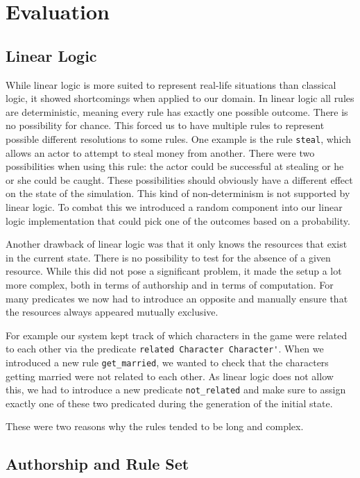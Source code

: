 \section{Evaluation} \label{evaulation}

\subsection{Linear Logic}
While linear logic is more suited to represent real-life situations than classical logic, it showed shortcomings when applied to our domain.
In linear logic all rules are deterministic, meaning every rule has exactly one possible outcome.
There is no possibility for chance.
This forced us to have multiple rules to represent possible different resolutions to some rules.
One example is the rule \lstinline{steal}, which allows an actor to attempt to steal money from another.
There were two possibilities when using this rule: the actor could be successful at stealing or he or she could be caught.
These possibilities should obviously have a different effect on the state of the simulation.
This kind of non-determinism is not supported by linear logic.
To combat this we introduced a random component into our linear logic implementation that could pick one of the outcomes based on a probability.


Another drawback of linear logic was that it only knows the resources that exist in the current state.
There is no possibility to test for the absence of a given resource.
While this did not pose a significant problem, it made the setup a lot more complex, both in terms of authorship and in terms of computation.
For many predicates we now had to introduce an opposite and manually ensure that the resources always appeared mutually exclusive.

For example our system kept track of which characters in the game were related to each other via the predicate \lstinline{related Character Character'}.
When we introduced a new rule \lstinline{get_married}, we wanted to check that the characters getting married were not related to each other.
As linear logic does not allow this, we had to introduce a new predicate \lstinline{not_related} and make sure to assign exactly one of these two predicated during the generation of the initial state.

These were two reasons why the rules tended to be long and complex.


\subsection{Authorship and Rule Set}
